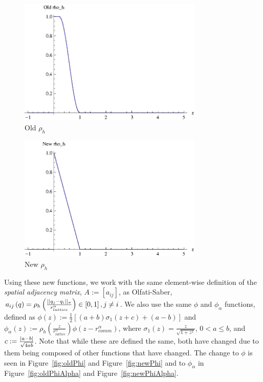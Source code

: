 \documentclass[10pt, conference]{IEEEtran}
\begin{document}
\begin{figure}[!b]
  \begin{center}
    \includegraphics[width=3.45in]{rhoHOld}
  \end{center}

  \caption{\small Old $\rho_h$}
  \label{fig:rhoHOld}
\end{figure}

\begin{figure}[!b]
  \begin{center}
    \includegraphics[width=3.45in]{rhoHNew}
  \end{center}

  \caption{\small New $\rho_h$}
  \label{fig:rhoHNew}
\end{figure}

Using these new functions, we work with the same element-wise definition of the \textit{spatial adjacency matrix}, $A := [a_{ij}]$, as Olfati-Saber, $a_{ij}\left(q\right) = \rho_{h}\left(\frac{\lvert\lvert q_j - q_i\rvert\rvert_{\sigma}}{r_{lattice}^{\alpha}}\right) \in \left[0, 1\right], j \neq i$.
%
We also use the same $\phi$ and $\phi_{\alpha}$ functions, defined as $\phi(z) := \frac{1}{2}\left[(a+b)\sigma_1(z+c)+(a-b)\right]$ and $\phi_{\alpha}(z) := \rho_h(\frac{z}{r_{lattice}^{\alpha}})\phi(z - r_{comm}^{\alpha})$, where $\sigma_1(z) = \frac{z}{\sqrt{1 + z^2}}$, $0 < a \leq b$, and $c := \frac{\lvert a - b\rvert}{\sqrt{4ab}}$.
%
Note that while these are defined the same, both have changed due to them being composed of other functions that have changed.
%
The change to $\phi$ is seen in Figure~\ref{fig:oldPhi} and Figure~\ref{fig:newPhi} and to $\phi_{\alpha}$ in Figure~\ref{fig:oldPhiAlpha} and Figure~\ref{fig:newPhiAlpha}.
\end{document}
